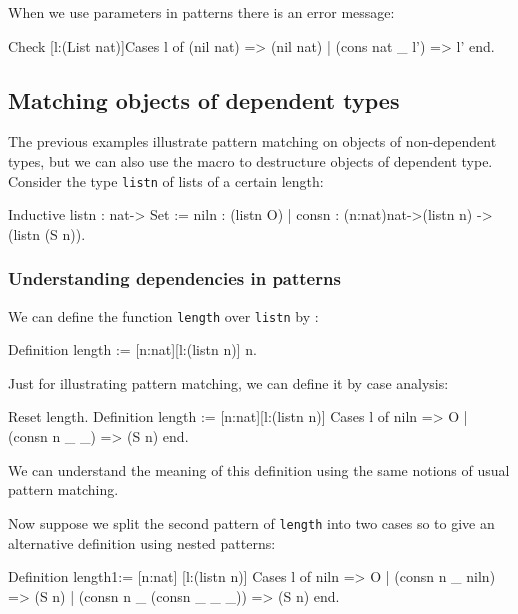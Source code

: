 When we use parameters in patterns there is an error message:
\begin{coq_example}
Check [l:(List nat)]Cases l of 
                             (nil nat)      => (nil nat)
                          | (cons nat _ l') => l'
                           end.
\end{coq_example}



\subsection{Matching objects of dependent types}
The previous examples illustrate pattern matching on objects of
non-dependent types, but we can also 
use the macro to destructure objects of dependent type.
Consider the type \verb+listn+ of lists of a certain length:

\begin{coq_example}
Inductive listn : nat-> Set := 
  niln : (listn O) 
| consn : (n:nat)nat->(listn n) -> (listn (S n)).
\end{coq_example}

\subsubsection{Understanding dependencies in patterns}
We can define the function \verb+length+ over \verb+listn+ by :

\begin{coq_example}
Definition length := [n:nat][l:(listn n)] n.
\end{coq_example}

Just for illustrating pattern matching, 
we can define it by case analysis:
\begin{coq_example}
Reset length.
Definition length := [n:nat][l:(listn n)]
                      Cases l of  
                         niln         => O 
                      | (consn n _ _) => (S n) 
                      end.
\end{coq_example}

We can understand the meaning of this definition using the
same notions of usual pattern matching.

Now suppose we split the second pattern  of \verb+length+ into two 
cases so to give an
alternative definition using nested patterns:
\begin{coq_example}
Definition length1:= [n:nat] [l:(listn n)]
   Cases l of 
        niln                   => O
   | (consn n _ niln)          => (S n)
   | (consn n _ (consn _ _ _)) => (S n)
  end.
\end{coq_example}

